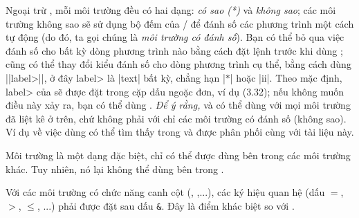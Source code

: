 \documentclass[11pt,leqno,titlepage,openany,oneside]{amsldoc}[1999/12/13]
\begin{document}
Ngoại trừ , mỗi môi trường đều có hai dạng:
\emph{có sao (*)} và \emph{không sao};
các môi trường không sao sẽ sử dụng bộ đếm  của \latex/
để đánh số các phương trình một cách tự động (do đó, ta gọi
chúng là \emph{môi trường có đánh số}).
Bạn có thể bỏ qua việc đánh số cho bất kỳ dòng phương trình nào
bằng cách đặt lệnh  trước khi dùng \cn{\\};
cũng có thể thay đổi kiểu đánh số cho dòng phương trình cụ thể, bằng
cách dùng |{|\<label>|}|, ở đây \<label> là |text| bất kỳ,
chẳng hạn |$*$| hoặc |ii|. Theo mặc định, \<label> của  sẽ được
đặt trong cặp dấu ngoặc đơn, ví dụ (3.32);
nếu không muốn điều này xảy ra, bạn có thể dùng .
\emph{Để ý rằng,}
 và  có thể dùng với mọi môi trường đã liệt kê ở trên,
chứ không phải với chỉ các môi trường có đánh số (không sao).
Ví dụ về việc dùng  có thể tìm thấy trong 
và  được phân phối cùng với tài liệu này.

\medskip
Môi trường  là một dạng đặc biệt, chỉ có thể được dùng
bên trong các môi trường khác. Tuy nhiên, nó lại không thể dùng bên
trong .

\medskip
Với các môi trường có chức năng canh cột (, ,...),
các ký hiệu quan hệ (dấu $=$, $>$, $\le$, ...) phải được đặt sau dấu \verb'&'.
Đây là điểm khác biệt so với .
\end{document}
